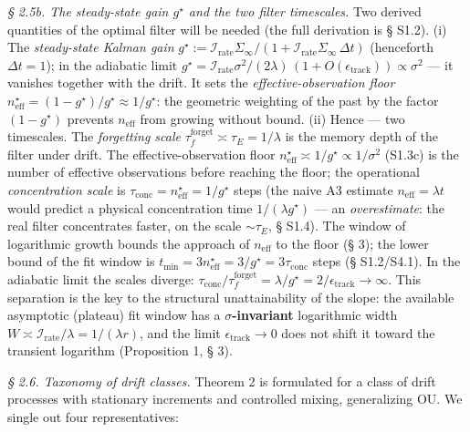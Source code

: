 \documentclass[12pt]{iopart}
\begin{document}
\emph{§ 2.5b. The steady-state gain \(g^\star\) and the two filter timescales.} Two derived quantities of the optimal filter will be needed (the full derivation is § S1.2). (i) The \emph{steady-state Kalman gain} \(g^\star := \mathcal I_{\text{rate}}\Sigma_\infty/(1+\mathcal I_{\text{rate}}\Sigma_\infty\,\Delta t)\) (henceforth \(\Delta t = 1\)); in the adiabatic limit \(g^\star = \mathcal I_{\text{rate}}\sigma^2/(2\lambda)\, (1+O(\epsilon_{\text{track}})) \propto \sigma^2\) --- it vanishes together with the drift. It sets the \emph{effective-observation floor} \(n_{\text{eff}}^\star = (1-g^\star)/g^\star \approx 1/g^\star\): the geometric weighting of the past by the factor \((1-g^\star)\) prevents \(n_{\text{eff}}\) from growing without bound. (ii) Hence --- two timescales. The \emph{forgetting scale} \(\tau_f^{\text{forget}} \asymp \tau_E = 1/\lambda\) is the memory depth of the filter under drift. The effective-observation floor \(n_{\text{eff}}^\star \asymp 1/g^\star \propto 1/\sigma^2\) (S1.3c) is the number of effective observations before reaching the floor; the operational \emph{concentration scale} is \(\tau_{\text{conc}} = n_{\text{eff}}^\star = 1/g^\star\) steps (the naive A3 estimate \(n_{\text{eff}} = \lambda t\) would predict a physical concentration time \(1/(\lambda g^\star)\) --- an \emph{overestimate}: the real filter concentrates faster, on the scale \(\sim\tau_E\), § S1.4). The window of logarithmic growth bounds the approach of \(n_{\text{eff}}\) to the floor (§ 3); the lower bound of the fit window is \(t_{\min} = 3n_{\text{eff}}^\star = 3/g^\star = 3\tau_{\text{conc}}\) steps (§ S1.2/S4.1). In the adiabatic limit the scales diverge: \(\tau_{\text{conc}}/\tau_f^{\text{forget}} = \lambda/g^\star = 2/\epsilon_{\text{track}} \to \infty\). This separation is the key to the structural unattainability of the slope: the available asymptotic (plateau) fit window has a \textbf{\(\sigma\)-invariant} logarithmic width \(W \asymp \mathcal I_{\text{rate}}/\lambda = 1/(\lambda r)\), and the limit \(\epsilon_{\text{track}}\to0\) does not shift it toward the transient logarithm (Proposition 1, § 3).



\emph{§ 2.6. Taxonomy of drift classes.} Theorem 2 is formulated for a class of drift processes with stationary increments and controlled mixing, generalizing OU. We single out four representatives:
\end{document}
